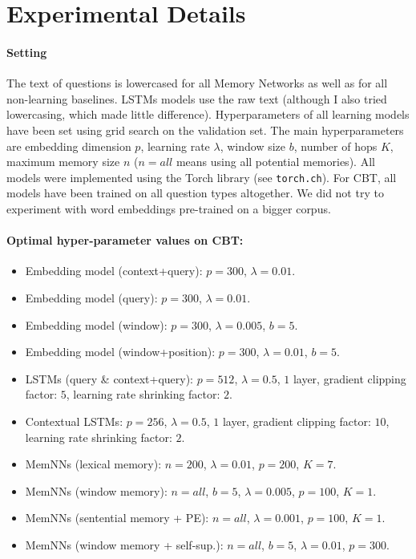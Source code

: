 \label{appendixmem}
\section{Experimental Details} \label{ap:hp}

\paragraph{Setting}
The text of questions is lowercased for all Memory Networks as
well as for all non-learning baselines. LSTMs models use the raw text (although I also tried lowercasing, which made little difference).
%
Hyperparameters of all learning models have been set using
grid search on the validation set.
%
The main hyperparameters are embedding dimension $p$, learning rate
$\lambda$, window size $b$, number of hops $K$, maximum memory size
$n$ ($n=all$ means using all potential memories).
%
All models were implemented using the Torch library (see {\tt torch.ch}).
%
For CBT, all models have been trained on all question types 
altogether. 
%
We did not try to experiment with word embeddings pre-trained on a
bigger corpus.

\paragraph{Optimal hyper-parameter values on CBT:}

\begin{itemize}
\item Embedding model (context+query): $p=300$, $\lambda=0.01$.
\item Embedding model (query): $p=300$, $\lambda=0.01$.
\item Embedding model (window): $p=300$, $\lambda=0.005$, $b=5$.
\item Embedding model (window+position): $p=300$, $\lambda=0.01$, $b=5$.
\item LSTMs (query \& context+query): $p=512$, $\lambda=0.5$, $1$
  layer, gradient clipping factor: $5$, learning rate shrinking factor: $2$.
\item Contextual LSTMs: $p=256$, $\lambda=0.5$, $1$
  layer, gradient clipping factor: $10$, learning rate shrinking
  factor: $2$.
\item MemNNs  (lexical memory): $n=200$, $\lambda=0.01$, $p=200$, $K=7$.
\item MemNNs  (window  memory): $n=all$, $b=5$, $\lambda=0.005$,
  $p=100$, $K=1$.
\item  MemNNs  (sentential memory + PE): $n=all$, $\lambda=0.001$,
  $p=100$, $K=1$.
\item MemNNs  (window  memory + self-sup.): $n=all$, $b=5$, $\lambda=0.01$,
  $p=300$.
\end{itemize}

